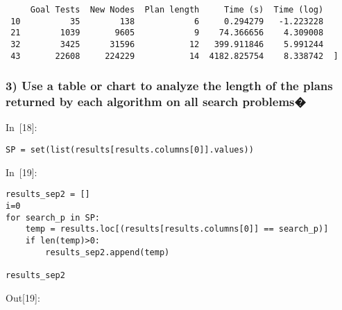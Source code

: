 \documentclass{article}
\begin{document}
\begin{verbatim}
     Goal Tests  New Nodes  Plan length     Time (s)  Time (log)  
 10          35        138            6     0.294279   -1.223228  
 21        1039       9605            9    74.366656    4.309008  
 32        3425      31596           12   399.911846    5.991244  
 43       22608     224229           14  4182.825754    8.338742  ]\end{verbatim}












\subsubsection*{3) Use a table or chart to analyze the length of the plans returned by each algorithm on all search problems�}





In~[18]:

    
\begin{verbatim}SP = set(list(results[results.columns[0]].values))
\end{verbatim}








In~[19]:

    
\begin{verbatim}results_sep2 = []
i=0
for search_p in SP:
    temp = results.loc[(results[results.columns[0]] == search_p)]
    if len(temp)>0:
        results_sep2.append(temp)
            
results_sep2
\end{verbatim}











Out[19]:
\end{document}
